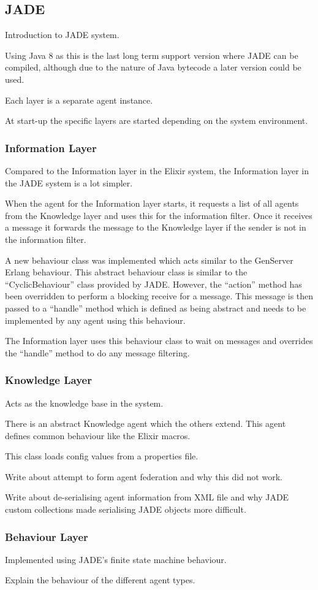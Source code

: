 \subsection{JADE}

Introduction to JADE system.

Using Java 8 as this is the last long term support version where JADE can be compiled, although due to the nature of Java bytecode a later version could be used.

Each layer is a separate agent instance.

At start-up the specific layers are started depending on the system environment.

\subsubsection{Information Layer}

Compared to the Information layer in the Elixir system, the Information layer in the JADE system is a lot simpler.

When the agent for the Information layer starts, it requests a list of all agents from the Knowledge layer and uses this for the information filter.
Once it receives a message it forwards the message to the Knowledge layer if the sender is not in the information filter.

A new behaviour class was implemented which acts similar to the GenServer Erlang behaviour.
This abstract behaviour class is similar to the ``CyclicBehaviour'' class provided by JADE\@.
However, the ``action'' method has been overridden to perform a blocking receive for a message.
This message is then passed to a ``handle'' method which is defined as being abstract and needs to be implemented by any agent using this behaviour.

The Information layer uses this behaviour class to wait on messages and overrides the ``handle'' method to do any message filtering.

\subsubsection{Knowledge Layer}

Acts as the knowledge base in the system.

There is an abstract Knowledge agent which the others extend.
This agent defines common behaviour like the Elixir macros.

This class loads config values from a properties file.

Write about attempt to form agent federation and why this did not work.

Write about de-serialising agent information from XML file and why JADE custom collections made serialising JADE objects more difficult.

\subsubsection{Behaviour Layer}

Implemented using JADE's finite state machine behaviour.

Explain the behaviour of the different agent types.
